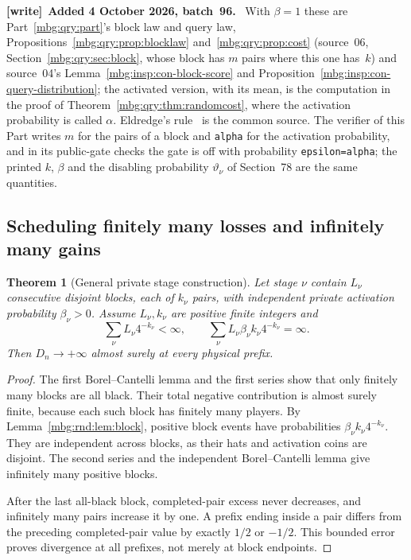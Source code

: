 \documentclass[11pt,letterpaper]{article}
\newtheorem{theorem}{Theorem}[section]
\theoremstyle{definition}
\newenvironment{writenote}[1][]{\par\smallskip\begingroup\small
 \noindent\textbf{[write]}\if\relax\detokenize{#1}\relax\else~\textbf{#1.}\fi\ }%
 {\par\endgroup\smallskip}
\begin{document}
\begin{writenote}[Added 4 October 2026, batch~96]
With $\beta=1$ these are Part~\ref{mbg:qry:part}'s block law and query law, Propositions~\ref{mbg:qry:prop:blocklaw} and~\ref{mbg:qry:prop:cost} (source~06, Section~\ref{mbg:qry:sec:block}, whose block has $m$ pairs where this one has~$k$) and source~04's Lemma~\ref{mbg:insp:con-block-score} and Proposition~\ref{mbg:insp:con-query-distribution}; the activated version, with its mean, is the computation in the proof of Theorem~\ref{mbg:qry:thm:randomcost}, where the activation probability is called $\alpha$. Eldredge's rule~\cite[Proposition~6.6]{hat:Eldredge} is the common source. The verifier of this Part writes $m$ for the pairs of a block and \texttt{alpha} for the activation probability, and in its public-gate checks the gate is off with probability \texttt{epsilon=alpha}; the printed $k$, $\beta$ and the disabling probability $\vartheta_\nu$ of Section~78 are the same quantities.
\end{writenote}

\subsection{Scheduling finitely many losses and infinitely many gains}

\begin{theorem}[General private stage construction]
\label{mbg:rnd:thm:schedule}
Let stage $\nu$ contain $L_\nu$ consecutive disjoint blocks, each of $k_\nu$
pairs, with independent private activation probability $\beta_\nu>0$.
Assume $L_\nu,k_\nu$ are positive finite integers and
\begin{equation}
 \sum_\nu L_\nu4^{-k_\nu}<\infty,
 \qquad
 \sum_\nu L_\nu\beta_\nu k_\nu4^{-k_\nu}=\infty.
 \label{mbg:rnd:eq:schedule-conditions}
\end{equation}
Then $D_n\to+\infty$ almost surely at every physical prefix.
\end{theorem}
\begin{proof}
The first Borel--Cantelli lemma and the first series show that only
finitely many blocks are all black. Their total negative contribution
is almost surely finite, because each such block has finitely many
players. By Lemma~\ref{mbg:rnd:lem:block}, positive block events have probabilities
$\beta_\nu k_\nu4^{-k_\nu}$. They are independent across blocks, as their
hats and activation coins are disjoint. The second series and the
independent Borel--Cantelli lemma give infinitely many positive blocks.

After the last all-black block, completed-pair excess never decreases,
and infinitely many pairs increase it by one. A prefix ending inside a
pair differs from the preceding completed-pair value by exactly
$1/2$ or $-1/2$. This bounded error proves divergence at all prefixes,
not merely at block endpoints.
\end{proof}
\end{document}
